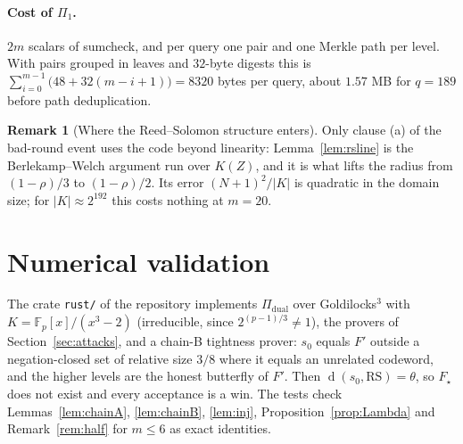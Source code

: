 \documentclass[11pt]{article}
\theoremstyle{definition}
\newtheorem{remark}[theorem]{Remark}
\newcommand{\F}{\mathbb{F}}
\newcommand{\K}{K}
\newcommand{\RS}{\mathrm{RS}}
\DeclareMathOperator{\dist}{d}
\begin{document}
\paragraph{Cost of $\Pi_1$.} $2m$ scalars of sumcheck, and per query one pair and one Merkle path per level. With pairs grouped in leaves and $32$-byte digests this is $\sum_{i=0}^{m-1}\big(48+32(m-i+1)\big)=8320$ bytes per query, about $1.57$ MB for $q=189$ before path deduplication.

\begin{remark}[Where the Reed--Solomon structure enters]
Only clause (a) of the bad-round event uses the code beyond linearity: Lemma~\ref{lem:rsline} is the Berlekamp--Welch argument run over $\K(Z)$, and it is what lifts the radius from $(1-\rho)/3$ to $(1-\rho)/2$. Its error $(N+1)^2/|\K|$ is quadratic in the domain size; for $|\K|\approx2^{192}$ this costs nothing at $m=20$.
\end{remark}

\section{Numerical validation}

The crate \texttt{rust/} of the repository implements $\Pi_{\mathrm{dual}}$ over Goldilocks$^3$ with $\K=\F_p[x]/(x^3-2)$ (irreducible, since $2^{(p-1)/3}\ne1$), the provers of Section~\ref{sec:attacks}, and a chain-B tightness prover: $s_0$ equals $F'$ outside a negation-closed set of relative size $3/8$ where it equals an unrelated codeword, and the higher levels are the honest butterfly of $F'$. Then $\dist(s_0,\RS)=\theta$, so $F_\star$ does not exist and every acceptance is a win. The tests check Lemmas~\ref{lem:chainA}, \ref{lem:chainB}, \ref{lem:inj}, Proposition~\ref{prop:Lambda} and Remark~\ref{rem:half} for $m\le6$ as exact identities.
\end{document}
